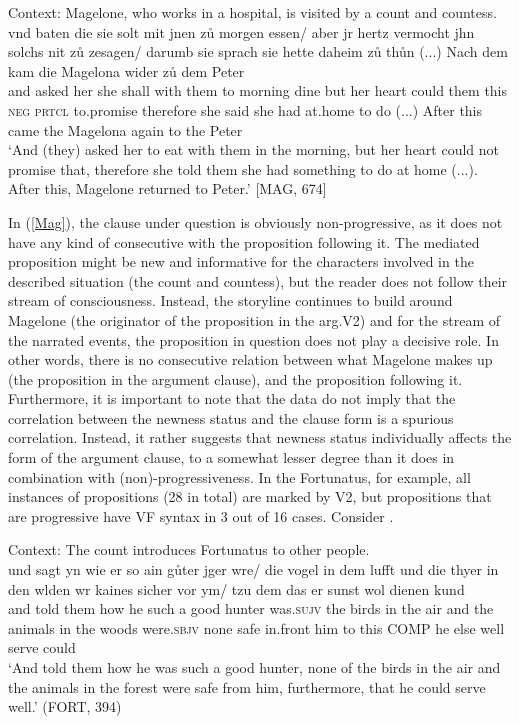 \documentclass[output=paper,colorlinks,citecolor=brown]{langscibook}
\begin{document}
\ea \label{Mag}
 Context: Magelone, who works in a hospital, is visited by a count and countess.\\
\gll vnd baten die sie solt mit jnen zů morgen essen/ aber jr hertz
vermocht jhn solchs nit zů zesagen/ darumb sie sprach sie hette daheim zů thůn (...) Nach dem kam die Magelona wider zů dem Peter\\
and asked her she shall with them to morning dine but her heart could them this \textsc{neg} \textsc{prtcl} to.promise therefore she said she had at.home to do (...) After this came the Magelona again to the Peter\\
\glt `And (they) asked her to eat with them in the morning, but her heart could not promise that, therefore she told them she had something to do at home (...). After this, Magelone returned to Peter.' \hfill [MAG, 674]
\z

In (\ref{Mag}), the clause under question is obviously non-progressive, as it does not have any kind of consecutive  with the proposition following it. The mediated proposition might be new and informative for the characters involved in the described situation (the count and countess), but the reader does not follow their stream of consciousness. Instead, the storyline continues to build around Magelone (the originator of the proposition in the arg.V2) and for the stream of the narrated events, the proposition in question does not play a decisive role. In other words, there is no consecutive relation between what Magelone makes up (the proposition in the argument clause), and the proposition following it. Furthermore, it is important to note that the data do not imply that the correlation between the newness status and the clause form is a spurious correlation. Instead, it rather suggests that newness status individually affects the form of the argument clause, to a somewhat lesser degree than it does in combination with (non)-progressiveness. In the Fortunatus, for example, all instances of  propositions (28 in total) are marked by V2, but  propositions that are progressive have VF syntax in 3 out of 16 cases. Consider .

\ea \label{Fort}
Context: The count introduces Fortunatus to other people.\\
\gll und sagt yn wie er so ain gůter j\oldae{}ger w\oldae{}re/ die vogel in dem lufft und die thyer in den w\oldae{}lden w\oldae{}r kaines sicher vor ym/ tzu dem das er sunst wol dienen kund\\
and told them how he such a good hunter was.\textsc{sujv} the birds in the air
and the animals in the woods were.\textsc{sbjv} none safe in.front him
to this COMP he else well serve could\\
\glt `And told them how he was such a good hunter, none of the birds in the air and the animals in the forest were safe from him, furthermore, that he could serve well.' \hfill (FORT, 394)
\z
\end{document}
